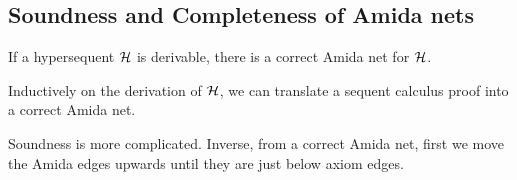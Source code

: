 \subsection{Soundness and Completeness of Amida nets}


 \begin{proposition}[Completeness]
  If a hypersequent $\mathcal{H}$ is derivable,
  there is a correct Amida net for $\mathcal{H}$.
 \end{proposition}
 \begin{proposition}
  Inductively on the derivation of $\mathcal{H}$,
  we can translate a sequent calculus proof into a correct Amida net.
 \end{proposition}

 Soundness is more complicated.
Inverse, from a correct Amida net, first we move the Amida edges upwards
until they are just below axiom edges.

